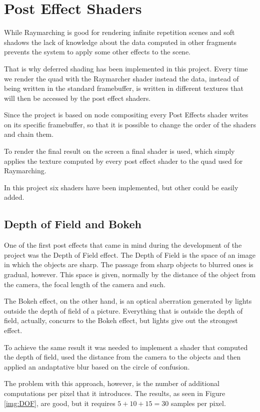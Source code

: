 \chapter{Post Effect Shaders}

While Raymarching is good for rendering infinite repetition scenes and soft shadows
the lack of knowledge about the data computed in other fragments prevents 
the system to apply some other effects to the scene.

That is why deferred shading has been implemented in this project. Every time we
render the quad with the Raymarcher shader instead the data, instead of being written in the standard
framebuffer, is written in different textures that will then be accessed by
the post effect shaders.

Since the project is based on node compositing every Post Effects shader writes
on its specific framebuffer, so that it is possible to change the order of the shaders
and chain them.

To render the final result on the screen a final shader is used, which simply
applies the texture computed by every post effect shader to the quad used for
Raymarching.

In this project six shaders have been implemented, but other could be easily
added. 

\section{Depth of Field and Bokeh}

One of the first post effects that came in mind during the development of the
project was the Depth of Field effect. The Depth of Field is the space of an image
in which the objects are sharp. The passage from sharp objects to blurred ones
is gradual, however. This space is given, normally by the distance of the object
from the camera, the focal length of the camera and such.

The Bokeh effect, on the other hand, is an optical aberration generated by
lights outside the depth of field of a picture. Everything that is outside the
depth of field, actually, concurrs to the Bokeh effect, but lights give out
the strongest effect. 

To achieve the same result it was needed to implement a shader that computed the depth
of field, used the distance from the camera to the objects and then applied
an andaptative blur based on the circle of confusion.

The problem with this approach, however, is the number of additional computations
per pixel that it introduces. The results, as seen in Figure \ref{img:DOF}, are
good, but it requires $5 + 10 + 15 = 30$ samples per pixel.

